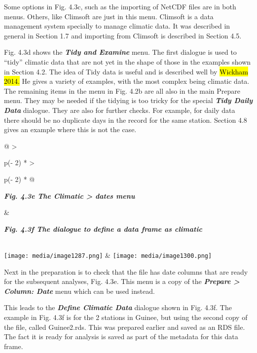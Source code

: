 \documentclass[
  letterpaper,
  DIV=11,
  numbers=noendperiod]{scrreprt}
\begin{document}
Some options in Fig. 4.3c, such as the importing of NetCDF files are in
both menus. Others, like Climsoft are just in this menu. Climsoft is a
data management system specially to manage climatic data. It was
described in general in Section 1.7 and importing from Climsoft is
described in Section 4.5.

Fig. 4.3d shows the \textbf{\emph{Tidy and Examine}} menu. The first
dialogue is used to ``tidy'' climatic data that are not yet in the shape
of those in the examples shown in Section 4.2. The idea of Tidy data is
useful and is described well by \hl{Wickham 2014.} He gives a variety of
examples, with the most complex being climatic data. The remaining items
in the menu in Fig. 4.2b are all also in the main Prepare menu. They may
be needed if the tidying is too tricky for the special
\textbf{\emph{Tidy Daily Data}} dialogue. They are also for further
checks. For example, for daily data there should be no duplicate days in
the record for the same station. Section 4.8 gives an example where this
is not the case.

\begin{longtable}[]{@{}
  >{\raggedright\arraybackslash}p{(\columnwidth - 2\tabcolsep) * }
  >{\raggedright\arraybackslash}p{(\columnwidth - 2\tabcolsep) * }@{}}
\toprule\noalign{}
\begin{minipage}[b]{\linewidth}\raggedright
\textbf{\emph{Fig. 4.3e The Climatic \textgreater{} dates menu}}
\end{minipage} & \begin{minipage}[b]{\linewidth}\raggedright
\textbf{\emph{Fig. 4.3f The dialogue to define a data frame as
climatic}}
\end{minipage} \\
\midrule\noalign{}
\endhead
\bottomrule\noalign{}
\endlastfoot
\texttt{[image: media/image1287.png]} &
\texttt{[image: media/image1300.png]} \\
\end{longtable}

Next in the preparation is to check that the file has date columns that
are ready for the subsequent analyses, Fig. 4.3e. This menu is a copy of
the \textbf{\emph{Prepare \textgreater{} Column: Date}} menu which can
be used instead.

This leads to the \textbf{\emph{Define Climatic Data}} dialogue shown in
Fig. 4.3f. The example in Fig. 4.3f is for the 2 stations in Guinee, but
using the second copy of the file, called Guinee2.rds. This was prepared
earlier and saved as an RDS file. The fact it is ready for analysis is
saved as part of the metadata for this data frame.
\end{document}
